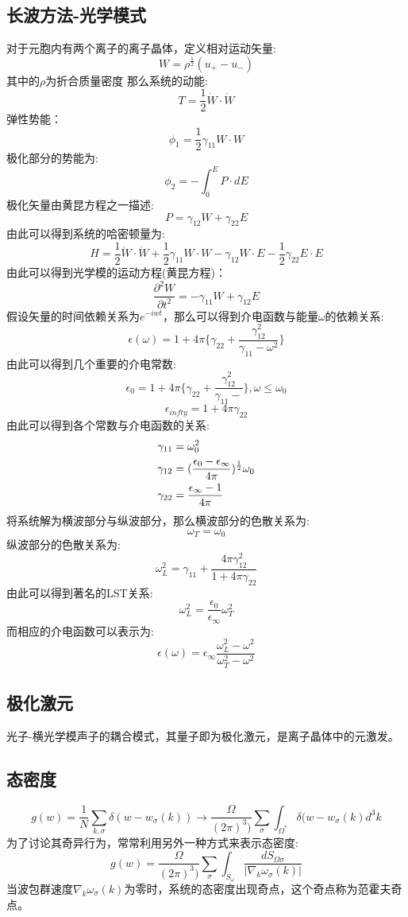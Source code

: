 \subsection{长波方法-光学模式}
对于元胞内有两个离子的离子晶体，定义相对运动矢量:
\[W=\rho^{\frac{1}{2}}(u_+-u_-)\]
其中的$\rho$为折合质量密度
那么系统的动能:
\[T=\frac{1}{2}\dot{W}\cdot\dot{W}\]
弹性势能：
\[\phi_1=\frac{1}{2}\gamma_{11}W\cdot W\]
极化部分的势能为:
\[\phi_2=-\int_0^EP\cdot dE\]
极化矢量由黄昆方程之一描述:
\[P=\gamma_{12}W+\gamma_{22}E\]
由此可以得到系统的哈密顿量为:
\[H=\frac{1}{2}\dot{W}\cdot\dot{W}+\frac{1}{2}\gamma_{11}W\cdot W-\gamma_{12}W\cdot E-\frac{1}{2}\gamma_{22}E\cdot E\]
由此可以得到光学模的运动方程(黄昆方程)：
\[\frac{\partial^2 W}{\partial t^2}=-\gamma_{11}W+\gamma_{12}E\]
假设矢量的时间依赖关系为$e^{-iwt}$，那么可以得到介电函数与能量$\omega$的依赖关系:
\[\epsilon(\omega)=1+4\pi\{\gamma_{22}+\frac{\gamma_{12}^2}{\gamma_{11}-\omega^2}\}\]
由此可以得到几个重要的介电常数:
\[\epsilon_0=1+4\pi\{\gamma_{22}+\frac{\gamma_{12}^2}{\gamma_{11}-}\},\omega\le\omega_0\]
\[\epsilon_{infty}=1+4\pi\gamma_{22}\]
由此可以得到各个常数与介电函数的关系:
\begin{align}
\notag \gamma_{11}&=\omega_0^2\\
\notag \gamma_{12}&=(\frac{\epsilon_0-\epsilon_\infty}{4\pi})^{\frac{1}{2}}\omega_0\\
\gamma_{22}&=\frac{\epsilon_\infty-1}{4\pi}
\end{align}
将系统解为横波部分与纵波部分，那么横波部分的色散关系为:
\[\omega_T=\omega_0\]
纵波部分的色散关系为:
\[\omega_L^2=\gamma_{11}+\frac{4\pi\gamma_{12}^2}{1+4\pi\gamma_{22}}\]
由此可以得到著名的LST关系:
\[\omega_L^2=\frac{\epsilon_0}{\epsilon_\infty}\omega_T^2\]
而相应的介电函数可以表示为:
\[\epsilon(\omega)=\epsilon_\infty\frac{\omega_L^2-\omega^2}{\omega_T^2-\omega^2}\]
\subsection{极化激元}
光子-横光学模声子的耦合模式，其量子即为极化激元，是离子晶体中的元激发。\par
\subsection{态密度}
\[g(w)=\frac{1}{N}\sum_{k,\sigma}\delta(w-w_\sigma(k))\rightarrow \frac{\Omega}{(2\pi)^3)}\sum_\sigma\int_{\Omega^*}\delta(w-w_\sigma(k)d^3k\]
为了讨论其奇异行为，常常利用另外一种方式来表示态密度:
\[g(w)=\frac{\Omega}{(2\pi)^3)}\sum_\sigma\int_{S_\omega}\frac{dS_{\Omega\sigma}}{|\nabla_k\omega_\sigma(k)|}\]
当波包群速度$\nabla_k\omega_\sigma(k)$为零时，系统的态密度出现奇点，这个奇点称为范霍夫奇点。\par
